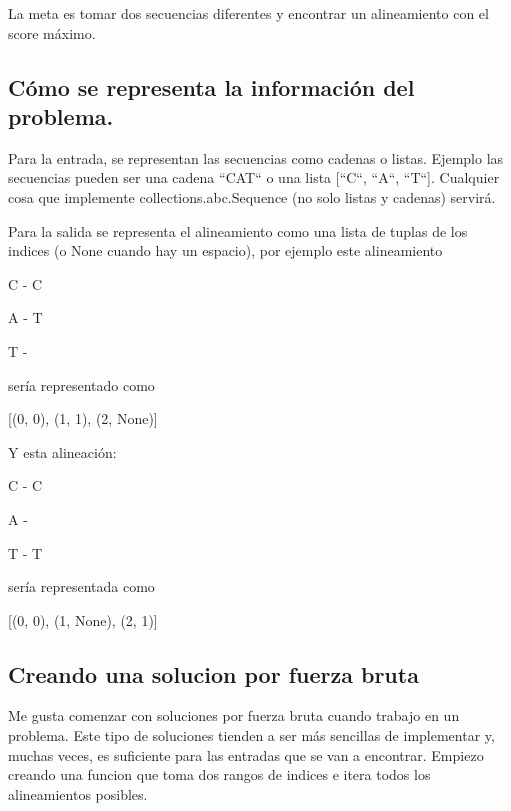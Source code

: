 \documentclass[usenatbib]{tjaa}
\begin{document}
La meta es tomar dos secuencias diferentes y encontrar un alineamiento con el score máximo.

\vspace{1em}

\subsection{Cómo se representa la información del problema.}

\vspace{1em}

Para la entrada, se representan las secuencias como cadenas o listas. Ejemplo las secuencias pueden ser una cadena ``CAT`` o una lista [``C``, ``A``, ``T``]. Cualquier cosa que implemente collections.abc.Sequence (no solo listas y cadenas) servirá.

Para la salida se representa el alineamiento como una lista de tuplas de los indices (o None cuando hay un espacio), por ejemplo este alineamiento

\vspace{1em}

C - C

A - T

T -

\vspace{1em}

sería representado como 

\vspace{1em}
[(0, 0), (1, 1), (2, None)]
\vspace{1em}

Y esta alineación:

C - C

A -

T - T

\vspace{1em}

sería representada como

\vspace{1em}
[(0, 0), (1, None), (2, 1)]

\subsection{Creando una solucion por fuerza bruta}


Me gusta comenzar con soluciones por fuerza bruta cuando trabajo en un problema. Este tipo de soluciones tienden a ser más sencillas de implementar y, muchas veces, es suficiente para las entradas que se van a encontrar. Empiezo creando una funcion que toma dos rangos de indices e itera todos los alineamientos posibles.
\end{document}
